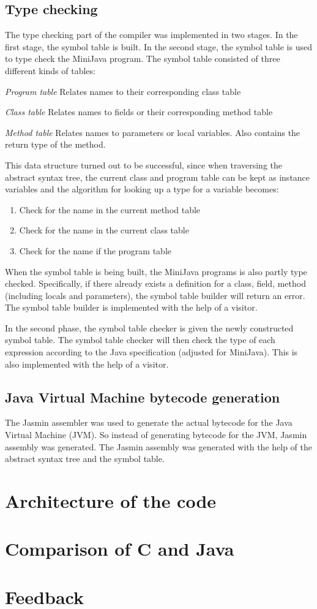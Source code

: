 \documentclass[11pt,oneside,a4paper]{article}
\begin{document}
\subsection{Type checking}
The type checking part of the compiler was implemented in two stages. In the
first stage, the symbol table is built. In the second stage, the symbol table
is used to type check the MiniJava program. The symbol table consisted of three
different kinds of tables:
\begin{description}
\item{\emph{Program table}} Relates names to their corresponding class table
\item{\emph{Class table}} Relates names to fields or their corresponding method
table
\item{\emph{Method table}} Relates names to parameters or local variables. Also
contains the return type of the method.
\end{description}
This data structure turned out to be successful, since when traversing the
abstract syntax tree, the current class and program table can be kept as
instance variables and the algorithm for looking up a type for a variable
becomes:
\begin{enumerate}
\item Check for the name in the current method table
\item Check for the name in the current class table
\item Check for the name if the program table
\end{enumerate}

When the symbol table is being built, the MiniJava programs is also partly type
checked. Specifically, if there already exists a definition for a class, field,
method (including locals and parameters), the symbol table builder will return
an error. The symbol table builder is implemented with the help of a visitor.

In the second phase, the symbol table checker is given the newly constructed 
symbol table. The symbol table checker will then check the type of each
expression according to the Java specification (adjusted for MiniJava). This is
also implemented with the help of a visitor.

\subsection{Java Virtual Machine bytecode generation}
The Jasmin assembler was used to generate the actual bytecode for the Java
Virtual Machine (JVM). So instead of generating bytecode for the JVM,
Jasmin assembly was generated. The Jasmin assembly was generated with the help
of the abstract syntax tree and the symbol table.
\section{Architecture of the code}
\section{Comparison of C and Java}
\label{sec:discussion}
\appendix
\section{Feedback}
\end{document}
